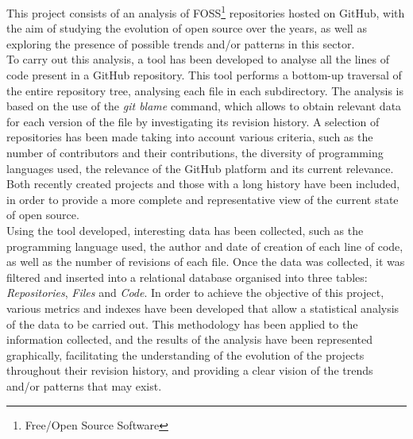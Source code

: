 \documentclass[a4paper, 12pt]{book}
\begin{document}
This project consists of an analysis of FOSS\footnote{Free/Open Source Software} repositories hosted on GitHub, with the aim of studying the
evolution of open source over the years, as well as exploring the presence of possible trends and/or patterns in this sector.
\\To carry out this analysis, a tool has been developed to analyse all the lines of code present in a GitHub repository. This tool performs a
bottom-up traversal of the entire repository tree, analysing each file in each subdirectory. The analysis is based on the use of the \textit{git blame}
command, which allows to obtain relevant data for each version of the file by investigating its revision history. A selection of repositories
has been made taking into account various criteria, such as the number of contributors and their contributions, the diversity of programming
languages used, the relevance of the GitHub platform and its current relevance. Both recently created projects and those with a long history
have been included, in order to provide a more complete and representative view of the current state of open source.
\\Using the tool developed, interesting data has been collected, such as the programming language used, the author and date of creation of each
line of code, as well as the number of revisions of each file. Once the data was collected, it was filtered and inserted into a relational database
organised into three tables: \textit{Repositories}, \textit{Files} and \textit{Code}. In order to achieve the objective of this project, various
metrics and indexes have been developed that allow a statistical analysis of the data to be carried out. This methodology has been applied to the
information collected, and the results of the analysis have been represented graphically, facilitating the understanding of the evolution of the
projects throughout their revision history, and providing a clear vision of the trends and/or patterns that may exist.


\end{document}
